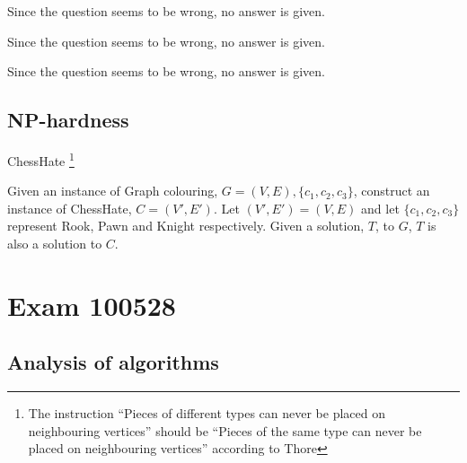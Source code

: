 \documentclass[a4paper]{article}
\newenvironment{task}[1]
{
	\begin{description}[align=right]
		\item [#1]
}{		%
	\end{description}
}
\DeclareMathOperator{\*}{\cdot}
\begin{document}
\begin{task}{9. (a)}
	\qquad Since the question seems to be wrong, no answer is given.
\end{task}

\begin{task}{(b)}
	\qquad Since the question seems to be wrong, no answer is given.
\end{task}

\begin{task}{(c)}
	\qquad Since the question seems to be wrong, no answer is given.
\end{task}

\subsection*{NP-hardness}

\begin{task}{10. (a)}
	 ChessHate \footnote{The instruction ``Pieces of different types can never be placed on neighbouring vertices'' should be ``Pieces of the same type can never be placed on neighbouring vertices'' according to Thore}
\end{task}

\begin{task}{(b)}
\end{task}

\begin{task}{(c)}
\end{task}

\begin{task}{(d)}
\end{task}

\begin{task}{(e)}
\end{task}

\begin{task}{(f)}
	\qquad Given an instance of Graph colouring, $G=(V,E),\{c_1,c_2,c_3\}$, construct an instance of ChessHate, $C=(V',E')$. Let $(V',E')=(V,E)$ and let $\{c_1,c_2,c_3\}$ represent Rook, Pawn and Knight respectively. Given a solution, $T$, to $G$, $T$ is also a solution to $C$. 
\end{task}

\pagebreak
\section*{Exam 100528}
\subsection*{Analysis of algorithms}
\end{document}
